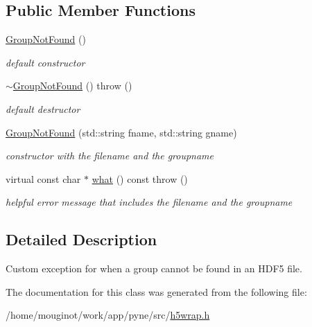 \subsection*{Public Member Functions}
\begin{DoxyCompactItemize}
\item 
\mbox{\label{classh5wrap_1_1_group_not_found_accc7d7bea9e86968335a46ee39d7d543}} 
\hyperlink{classh5wrap_1_1_group_not_found_accc7d7bea9e86968335a46ee39d7d543}{Group\+Not\+Found} ()
\begin{DoxyCompactList}\small\item\em default constructor \end{DoxyCompactList}\item 
\mbox{\label{classh5wrap_1_1_group_not_found_a79dea7d1d5e3ffd7a7e83b4a2636398a}} 
\hyperlink{classh5wrap_1_1_group_not_found_a79dea7d1d5e3ffd7a7e83b4a2636398a}{$\sim$\+Group\+Not\+Found} ()  throw ()
\begin{DoxyCompactList}\small\item\em default destructor \end{DoxyCompactList}\item 
\mbox{\label{classh5wrap_1_1_group_not_found_a74f7e8f6efcf33503f5fec62eead40c3}} 
\hyperlink{classh5wrap_1_1_group_not_found_a74f7e8f6efcf33503f5fec62eead40c3}{Group\+Not\+Found} (std\+::string fname, std\+::string gname)
\begin{DoxyCompactList}\small\item\em constructor with the filename and the groupname \end{DoxyCompactList}\item 
\mbox{\label{classh5wrap_1_1_group_not_found_a65549c040e732b05a83c3791d9b351d9}} 
virtual const char $\ast$ \hyperlink{classh5wrap_1_1_group_not_found_a65549c040e732b05a83c3791d9b351d9}{what} () const  throw ()
\begin{DoxyCompactList}\small\item\em helpful error message that includes the filename and the groupname \end{DoxyCompactList}\end{DoxyCompactItemize}


\subsection{Detailed Description}
Custom exception for when a group cannot be found in an H\+D\+F5 file. 

The documentation for this class was generated from the following file\+:\begin{DoxyCompactItemize}
\item 
/home/mouginot/work/app/pyne/src/\hyperlink{h5wrap_8h}{h5wrap.\+h}\end{DoxyCompactItemize}
